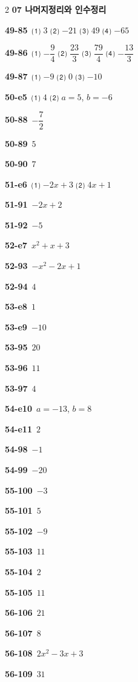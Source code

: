 \documentclass[10pt,a4paper]{article}
\begin{document}
\begin{multicols}{2}
\noindent\textbf{07 나머지정리와 인수정리}\par\smallskip
\noindent\textbf{49-85}\ ⑴ $3$ ⑵ $-21$ ⑶ $49$ ⑷ $-65$\par
\noindent\textbf{49-86}\ ⑴ $-\dfrac{9}{4}$ ⑵ $\dfrac{23}{3}$ ⑶ $\dfrac{79}{4}$ ⑷ $-\dfrac{13}{3}$\par
\noindent\textbf{49-87}\ ⑴ $-9$ ⑵ $0$ ⑶ $-10$\par
\noindent\textbf{50-e5}\ ⑴ $4$ ⑵ $a=5$, $b=-6$\par
\noindent\textbf{50-88}\ $-\dfrac{7}{2}$\par
\noindent\textbf{50-89}\ $5$\par
\noindent\textbf{50-90}\ $7$\par
\noindent\textbf{51-e6}\ ⑴ $-2x+3$ ⑵ $4x+1$\par
\noindent\textbf{51-91}\ $-2x+2$\par
\noindent\textbf{51-92}\ $-5$\par
\noindent\textbf{52-e7}\ $x^2+x+3$\par
\noindent\textbf{52-93}\ $-x^2-2x+1$\par
\noindent\textbf{52-94}\ $4$\par
\noindent\textbf{53-e8}\ $1$\par
\noindent\textbf{53-e9}\ $-10$\par
\noindent\textbf{53-95}\ $20$\par
\noindent\textbf{53-96}\ $11$\par
\noindent\textbf{53-97}\ $4$\par
\noindent\textbf{54-e10}\ $a=-13$, $b=8$\par
\noindent\textbf{54-e11}\ $2$\par
\noindent\textbf{54-98}\ $-1$\par
\noindent\textbf{54-99}\ $-20$\par
\noindent\textbf{55-100}\ $-3$\par
\noindent\textbf{55-101}\ $5$\par
\noindent\textbf{55-102}\ $-9$\par
\noindent\textbf{55-103}\ $11$\par
\noindent\textbf{55-104}\ $2$\par
\noindent\textbf{55-105}\ $11$\par
\noindent\textbf{56-106}\ $21$\par
\noindent\textbf{56-107}\ $8$\par
\noindent\textbf{56-108}\ $2x^2-3x+3$\par
\noindent\textbf{56-109}\ $31$\par

\end{multicols}
\end{document}
